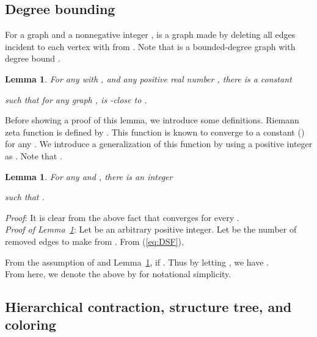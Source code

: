 \documentclass[11pt]{article}
\newtheorem{lm}[thm]{Lemma}
\newcommand{\qed}{\hspace*{\fill} }
\begin{document}
\subsection{Degree bounding}



For a graph  and a nonnegative integer , 
 is a graph made by deleting all edges incident to each vertex  with  from . 
Note that  is a bounded-degree graph with degree bound . 

\begin{lm}\label{lm:degreebound}
For any  with , 
and any positive real number , 
there is a constant 
 
such that for any graph , 
 is -close to . 
\end{lm}


Before showing a proof of this lemma, we introduce some definitions. 
Riemann zeta function is defined by
. 
This function is known to converge to a constant () 
for any . 
We introduce a generalization of this function by using a positive integer  as 
. 
Note that . 




\begin{lm}\label{lm:converge_zeta}
For any  and , there is an integer 
 
such that . 
\end{lm}

\noindent
{\em Proof}: 
It is clear from the above fact that  converges for every . \qed\\

\noindent
{\em Proof of Lemma~\ref{lm:degreebound}}: 
Let  be an arbitrary positive integer. 
Let  be the number of removed edges to make  from . 
From (\ref{eq:DSF}), 

From the assumption of  and Lemma~\ref{lm:converge_zeta}, 
 if 
. 
Thus by letting 
, 
we have . \qed\\

From here, we denote the above  by  for notational simplicity. 





















\subsection{Hierarchical contraction, structure tree, and coloring}
\end{document}

